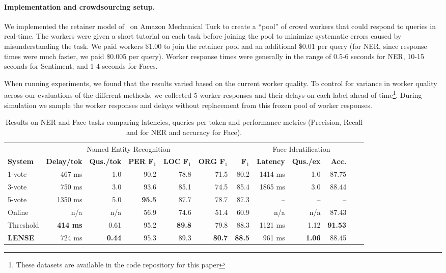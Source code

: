 \paragraph{Implementation and crowdsourcing setup.}
We implemented the retainer model of~\cite{bernstein2011crowds} on Amazon Mechanical Turk to create a ``pool'' of crowd workers that could respond to queries in real-time.
The workers were given a short tutorial on each task before joining the pool to minimize systematic errors caused by misunderstanding the task.
We paid workers \$1.00 to join the retainer pool and an additional \$0.01 per query (for NER, since response times were much faster, we paid \$0.005 per query).
Worker response times were generally in the range of 0.5-6 seconds for NER, 10-15 seconds for Sentiment, and 1-4 seconds for Faces.

When running experiments, we found that the results varied based on the current worker quality. %
To control for variance in worker quality across our evaluations of the different methods, we collected 5 worker responses and their delays on each label ahead of time\footnote{These datasets are available in the code repository for this paper}.
During simulation we sample the worker responses and delays without replacement from this frozen pool of worker responses.

\begin{table}[t]
\begin{tabular}{l r r r r r r | r r r r r}
  \multicolumn{7}{c|}{Named Entity Recognition} & 
      \multicolumn{3}{c}{Face Identification} \\
      \textbf{System} & \textbf{Delay/tok} & \textbf{Qus./tok} & \textbf{PER F$_1$} & \textbf{LOC F$_1$} & \textbf{ORG F$_1$} & \textbf{F$_1$}
          & \textbf{Latency} & \textbf{Qus./ex} & \textbf{Acc.} 
    \\ \hline
    1-vote & 467 ms & 1.0 & 90.2 & 78.8 & 71.5 & 80.2
      & %
      1414 ms & 1.0 & 87.75 \\ %
    3-vote & 750 ms & 3.0 & 93.6 & 85.1 & 74.5 & 85.4
        & %
        1865 ms & 3.0 & 88.44 \\ %
    5-vote & 1350 ms & 5.0 & \textbf{95.5} & 87.7 & 78.7 & 87.3 
        & 
        -- & -- & -- \\ \hline
    Online & n/a & n/a & 56.9 & 74.6 & 51.4 & 60.9
        & n/a & n/a & 87.43 \\    %
    Threshold & \textbf{414 ms} & 0.61 & 95.2 & \textbf{89.8} & 79.8 & 88.3
        & 1121 ms & 1.12 & \textbf{91.53} \\ %
    \textbf{LENSE} & 724 ms & \textbf{0.44} & 95.3 & 89.3 & \textbf{80.7} & \textbf{88.5} 
    & 961 ms & \textbf{1.06} & 88.45 \\   %
\end{tabular}
\caption{Results on NER and Face tasks comparing latencies, queries per token and performance metrics (Precision, Recall and \fone{} for NER and accuracy for Face).}
\label{tbl:results}
\end{table}

